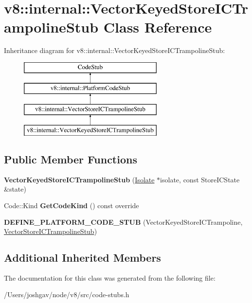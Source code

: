\hypertarget{classv8_1_1internal_1_1_vector_keyed_store_i_c_trampoline_stub}{}\section{v8\+:\+:internal\+:\+:Vector\+Keyed\+Store\+I\+C\+Trampoline\+Stub Class Reference}
\label{classv8_1_1internal_1_1_vector_keyed_store_i_c_trampoline_stub}
Inheritance diagram for v8\+:\+:internal\+:\+:Vector\+Keyed\+Store\+I\+C\+Trampoline\+Stub\+:\begin{figure}[H]
\begin{center}
\leavevmode
\includegraphics[height=4.000000cm]{classv8_1_1internal_1_1_vector_keyed_store_i_c_trampoline_stub}
\end{center}
\end{figure}
\subsection*{Public Member Functions}
\begin{DoxyCompactItemize}
\item 
{\bfseries Vector\+Keyed\+Store\+I\+C\+Trampoline\+Stub} (\hyperlink{classv8_1_1internal_1_1_isolate}{Isolate} $\ast$isolate, const Store\+I\+C\+State \&state)\hypertarget{classv8_1_1internal_1_1_vector_keyed_store_i_c_trampoline_stub_a0e2bb926f2f576d33b28193b7c9677c7}{}\label{classv8_1_1internal_1_1_vector_keyed_store_i_c_trampoline_stub_a0e2bb926f2f576d33b28193b7c9677c7}

\item 
Code\+::\+Kind {\bfseries Get\+Code\+Kind} () const  override\hypertarget{classv8_1_1internal_1_1_vector_keyed_store_i_c_trampoline_stub_a907b8b52296dae4b4d0ce3726db6ea13}{}\label{classv8_1_1internal_1_1_vector_keyed_store_i_c_trampoline_stub_a907b8b52296dae4b4d0ce3726db6ea13}

\item 
{\bfseries D\+E\+F\+I\+N\+E\+\_\+\+P\+L\+A\+T\+F\+O\+R\+M\+\_\+\+C\+O\+D\+E\+\_\+\+S\+T\+UB} (Vector\+Keyed\+Store\+I\+C\+Trampoline, \hyperlink{classv8_1_1internal_1_1_vector_store_i_c_trampoline_stub}{Vector\+Store\+I\+C\+Trampoline\+Stub})\hypertarget{classv8_1_1internal_1_1_vector_keyed_store_i_c_trampoline_stub_a152ec9585216807dea581502e71bf947}{}\label{classv8_1_1internal_1_1_vector_keyed_store_i_c_trampoline_stub_a152ec9585216807dea581502e71bf947}

\end{DoxyCompactItemize}
\subsection*{Additional Inherited Members}


The documentation for this class was generated from the following file\+:\begin{DoxyCompactItemize}
\item 
/\+Users/joshgav/node/v8/src/code-\/stubs.\+h\end{DoxyCompactItemize}
